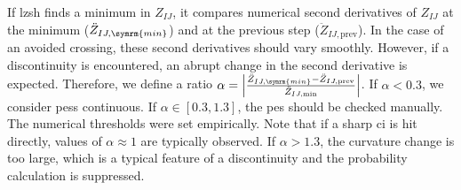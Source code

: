 If \gls{lzsh} finds a minimum in $Z_{IJ}$, it compares numerical second derivatives of $Z_{IJ}$ at the minimum ($\ddot Z_{IJ,\symrm{min}}$) and at the previous step ($\ddot Z_{IJ,\mathrm{prev}}$). In the case of an avoided crossing, these second derivatives should vary smoothly. However, if a discontinuity is encountered, an abrupt change in the second derivative is expected. Therefore, we define a ratio $\alpha=\left\lvert\frac{\ddot Z_{IJ,\symrm{min}}-\ddot Z_{IJ,\mathrm{prev}}}{\ddot Z_{IJ,\mathrm{min}}}\right\rvert$. If $\alpha<0.3$, we consider \glspl{pes} continuous. If $\alpha\in[0.3,1.3]$, the \gls{pes} should be checked manually. The numerical thresholds were set empirically. Note that if a sharp \gls{ci} is hit directly, values of $\alpha\approx1$ are typically observed. If $\alpha>1.3$, the curvature change is too large, which is a typical feature of a discontinuity and the probability calculation is suppressed.\supercite{10.1021/acs.jctc.5c01176}
